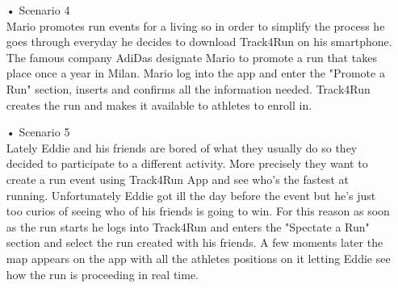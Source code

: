 \begin{enumerate}
\item[•]{\Large Scenario 4} \\
Mario promotes run events for a living so in order to simplify the process he goes through everyday he decides to download Track4Run on his smartphone. The famous company AdiDas designate Mario to promote a run that takes place once a year in Milan. Mario log into the app and enter the "Promote a Run" section, inserts and confirms all the information needed. Track4Run creates the run and makes it available to athletes to enroll in.
\item[•]{\Large Scenario 5} \\
Lately Eddie and his friends are bored of what they usually do so they decided to participate to a different activity. More precisely they want to create a run event using Track4Run App and see who's the fastest at running. Unfortunately Eddie got ill the day before the event but he's just too curios of seeing who of his friends is going to win. For this reason as soon as the run starts he logs into Track4Run and enters the "Spectate a Run" section and select the run created with his friends. A few moments later the map appears on the app with all the athletes positions on it letting Eddie see how the run is proceeding in real time.

\end{enumerate}

